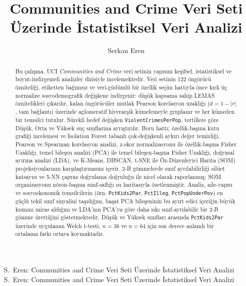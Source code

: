 \documentclass{ieeeaccess}
\begin{document}
\doi{}

\title{Communities and Crime Veri Seti Üzerinde İstatistiksel Veri Analizi}
\author{Serkan Eren}

\address[1]{Yapay Zekâ Yüksek Lisans Programı, Bilgisayar Mühendisliği Bölümü, Mühendislik Fakültesi, Gebze Teknik Üniversitesi, Kocaeli, Türkiye}


\markboth
{S.~Eren: Communities and Crime Veri Seti Üzerinde İstatistiksel Veri Analizi}
{S.~Eren: Communities and Crime Veri Seti Üzerinde İstatistiksel Veri Analizi}


\begin{abstract}
Bu çalışma, UCI \emph{Communities and Crime} veri setinin yapısını keşifsel, istatistiksel ve boyut-indirgemeli analizler dizisiyle incelemektedir. Veri setinin 122 öngörücü özniteliği, etiketten bağımsız ve veri-güdümlü bir özellik seçim hattıyla önce kırk üç normalize sosyodemografik değişkene indirgenir: düşük kapsama sahip LEMAS öznitelikleri çıkarılır, kalan öngörücüler mutlak Pearson korelasyon uzaklığı ($d = 1 - |r|$, tam bağlantı) üzerinde aglomeratif hiyerarşik kümelemeyle gruplanır ve her kümeden bir temsilci tutulur. Sürekli hedef değişken \texttt{ViolentCrimesPerPop}, tertillere göre Düşük, Orta ve Yüksek suç sınıflarına ayrıştırılır. Boru hattı; özellik-başına kutu grafiği incelemesi ve Isolation Forest tabanlı çok-değişkenli aykırı değer temizliği, Pearson ve Spearman korelasyon analizi, z-skor normalizasyonu ile özellik-başına Fisher Uzaklığı, temel bileşen analizi (PCA) ile temel bileşen-başına Fisher Uzaklığı, doğrusal ayırma analizi (LDA), ve K-Means, DBSCAN, t-SNE ile Öz-Düzenleyici Harita (SOM) projeksiyonlarının karşılaştırmasını içerir. 2-B gömmelerde sınıf ayrılabilirliği silüet katsayısı ve 5-NN çapraz doğrulama doğruluğu ile nicel olarak raporlanmış; SOM organizasyonu nöron-başına sınıf-saflığı ısı haritasıyla özetlenmiştir. Analiz, aile-yapısı ve sosyoekonomik temsilcilerin (örn. \texttt{PctKids2Par}, \texttt{PctIlleg}, \texttt{PctPopUnderPov}) en güçlü tekil sınıf sinyalini taşıdığını, başat PCA bileşeninin bu ayırt edici içeriğin büyük kısmını miras aldığını ve LDA'nın PCA'ya göre daha sıkı sınıf-ayrılabilir bir 2-B gömme ürettiğini göstermektedir. Düşük ve Yüksek sınıfları arasında \texttt{PctKids2Par} üzerinde uygulanan Welch t-testi, $n=36$ ve $n=64$ için son derece anlamlı bir ortalama farkı ortaya koymaktadır.
\end{abstract}
\end{document}
